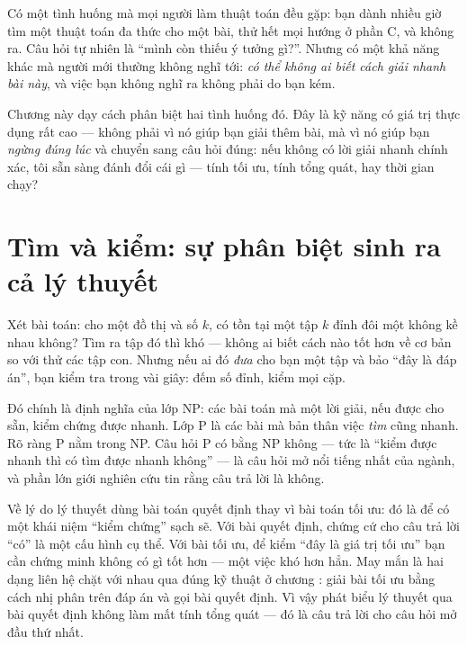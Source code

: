 \documentclass[../../algorithm.tex]{subfiles}
\begin{document}
Có một tình huống mà mọi người làm thuật toán đều gặp: bạn dành nhiều giờ tìm một thuật toán đa thức cho một bài, thử hết mọi hướng ở phần C, và không ra. Câu hỏi tự nhiên là ``mình còn thiếu ý tưởng gì?''. Nhưng có một khả năng khác mà người mới thường không nghĩ tới: \emph{có thể không ai biết cách giải nhanh bài này}, và việc bạn không nghĩ ra không phải do bạn kém.

Chương này dạy cách phân biệt hai tình huống đó. Đây là kỹ năng có giá trị thực dụng rất cao --- không phải vì nó giúp bạn giải thêm bài, mà vì nó giúp bạn \emph{ngừng đúng lúc} và chuyển sang câu hỏi đúng: nếu không có lời giải nhanh chính xác, tôi sẵn sàng đánh đổi cái gì --- tính tối ưu, tính tổng quát, hay thời gian chạy?

\section{Tìm và kiểm: sự phân biệt sinh ra cả lý thuyết}

Xét bài toán: cho một đồ thị và số \(k\), có tồn tại một tập \(k\) đỉnh đôi một không kề nhau không? Tìm ra tập đó thì khó --- không ai biết cách nào tốt hơn về cơ bản so với thử các tập con. Nhưng nếu ai đó \emph{đưa} cho bạn một tập và bảo ``đây là đáp án'', bạn kiểm tra trong vài giây: đếm số đỉnh, kiểm mọi cặp.

Đó chính là định nghĩa của lớp NP: các bài toán mà một lời giải, nếu được cho sẵn, kiểm chứng được nhanh. Lớp P là các bài mà bản thân việc \emph{tìm} cũng nhanh. Rõ ràng P nằm trong NP. Câu hỏi P có bằng NP không --- tức là ``kiểm được nhanh thì có tìm được nhanh không'' --- là câu hỏi mở nổi tiếng nhất của ngành, và phần lớn giới nghiên cứu tin rằng câu trả lời là không.

Về lý do lý thuyết dùng bài toán quyết định thay vì bài toán tối ưu: đó là để có một khái niệm ``kiểm chứng'' sạch sẽ. Với bài quyết định, chứng cứ cho câu trả lời ``có'' là một cấu hình cụ thể. Với bài tối ưu, để kiểm ``đây là giá trị tối ưu'' bạn cần chứng minh không có gì tốt hơn --- một việc khó hơn hẳn. May mắn là hai dạng liên hệ chặt với nhau qua đúng kỹ thuật ở chương : giải bài tối ưu bằng cách nhị phân trên đáp án và gọi bài quyết định. Vì vậy phát biểu lý thuyết qua bài quyết định không làm mất tính tổng quát --- đó là câu trả lời cho câu hỏi mở đầu thứ nhất.
\end{document}
